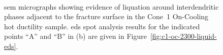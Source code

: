 {\begin{figure}
    \centering
     \\
    \caption[]{\Gls{sem} micrographs showing evidence of liquation around interdendritic phases adjacent to the fracture surface in the Cone~1 On-Cooling \protect{} hot ductility sample. \Gls{eds} spot analysis results for the indicated points ``A'' and ``B'' in (b) are given in Figure~\ref{fig:c1-oc-2300-liquid-eds}.}
    \label{fig:c1-oc-2300-sem-liquid}
\end{figure}

}
